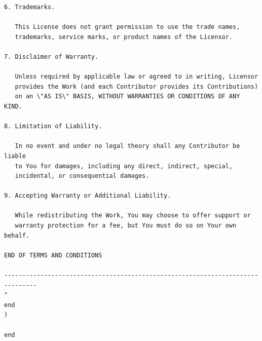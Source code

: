 \documentclass[12pt,a4paper]{article}
\begin{document}
\begin{lstlisting}[style=isabellegray]
6. Trademarks.

   This License does not grant permission to use the trade names,
   trademarks, service marks, or product names of the Licensor.

7. Disclaimer of Warranty.

   Unless required by applicable law or agreed to in writing, Licensor
   provides the Work (and each Contributor provides its Contributions)
   on an \"AS IS\" BASIS, WITHOUT WARRANTIES OR CONDITIONS OF ANY KIND.

8. Limitation of Liability.

   In no event and under no legal theory shall any Contributor be liable
   to You for damages, including any direct, indirect, special,
   incidental, or consequential damages.

9. Accepting Warranty or Additional Liability.

   While redistributing the Work, You may choose to offer support or
   warranty protection for a fee, but You must do so on Your own behalf.

END OF TERMS AND CONDITIONS

-------------------------------------------------------------------------------
"
end
)

end
\end{lstlisting}
\end{document}
